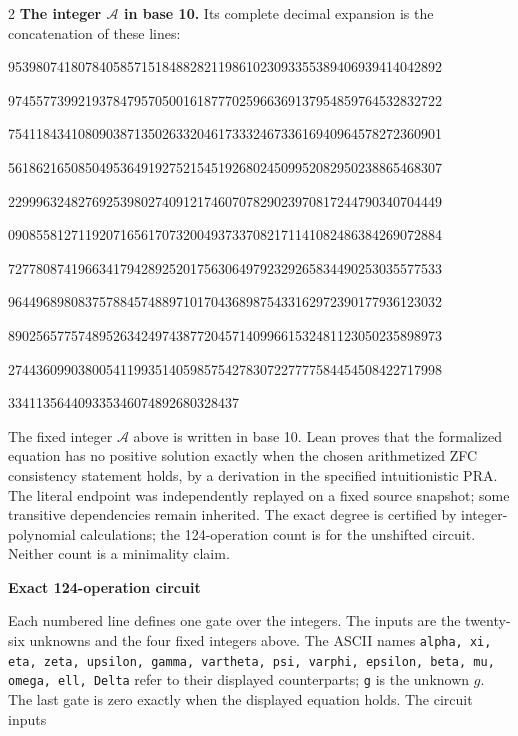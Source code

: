\documentclass[10pt]{article}
\begin{document}
\begin{multicols}{2}
\textbf{The integer $\mathcal A$ in base 10.}
Its complete decimal expansion is the concatenation of these lines:\par
\begingroup\fontsize{7.7}{8.2}\selectfont{}\par
95398074180784058571518488282119861023093355389406939414042892\par
97455773992193784795705001618777025966369137954859764532832722\par
75411843410809038713502633204617333246733616940964578272360901\par
56186216508504953649192752154519268024509952082950238865468307\par
22999632482769253980274091217460707829023970817244790340704449\par
09085581271192071656170732004937337082171141082486384269072884\par
72778087419663417942892520175630649792329265834490253035577533\par
96449689808375788457488971017043689875433162972390177936123032\par
89025657757489526342497438772045714099661532481123050235898973\par
27443609903800541199351405985754278307227777584454508422717998\par
334113564409335346074892680328437\par
\endgroup
\normalfont\fontsize{7.7}{8.2}\selectfont
The fixed integer $\mathcal A$ above is written in base 10. Lean proves that the formalized equation has no positive solution exactly
when the chosen arithmetized ZFC consistency statement holds, by a derivation
in the specified intuitionistic PRA. The literal endpoint was independently
replayed on a fixed source snapshot; some transitive dependencies remain
inherited. The exact degree is certified by integer-polynomial calculations;
the 124-operation count is for the unshifted circuit. Neither count is a
minimality claim.
\end{multicols}
\clearpage
\begin{center}{\large\bfseries Exact 124-operation circuit}\end{center}
Each numbered line defines one gate over the integers. The inputs are the
twenty-six unknowns and the four fixed integers above. The ASCII names
\texttt{alpha, xi, eta, zeta, upsilon, gamma, vartheta, psi, varphi, epsilon, beta, mu, omega, ell, Delta}
refer to their displayed counterparts; \texttt{g} is the unknown $g$. The last
gate is zero exactly when the displayed equation holds. The circuit inputs
\end{document}
